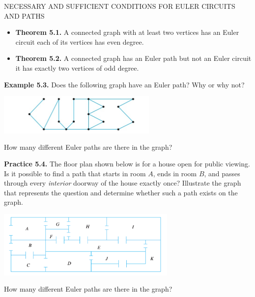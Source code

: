 \documentclass[aspectratio=169]{beamer}
\begin{document}
\begin{frame}[plain]{NECESSARY AND SUFFICIENT CONDITIONS FOR EULER CIRCUITS AND PATHS}
  \begin{itemize}
   \item {\bf Theorem 5.1.} A connected graph with at least two vertices has an Euler circuit 
    each of its vertices has even degree.
      \item {\bf Theorem 5.2.} A connected graph has an Euler path but not an Euler circuit 
       it has exactly two vertices of odd degree.
  \end{itemize}
\medskip
  
{\bf Example 5.3.}  Does the following graph have an Euler path? Why or why not?
     \begin{center}
        \includegraphics[height=2cm]{./img/lecture5-fig4.png}
      \end{center} 
   
   How many different Euler paths are there in the graph?    
      
\end{frame}

\begin{frame}[plain]{}

{\bf Practice 5.4.} The floor plan shown below is for a house open for public viewing. 
 Is it possible to find a path that starts in room $A$, ends in room $B$, and passes through 
 every \emph{interior} doorway 
 of the house exactly once?
 Illustrate the graph that represents the question and
 determine whether such a path exists on the graph. 

  \begin{center}
        \includegraphics[height=3.3cm]{./img/lecture5-fig5.png}
      \end{center} 

 How many different Euler paths are there in the graph? 
 
 \end{frame}
 
\end{document}
